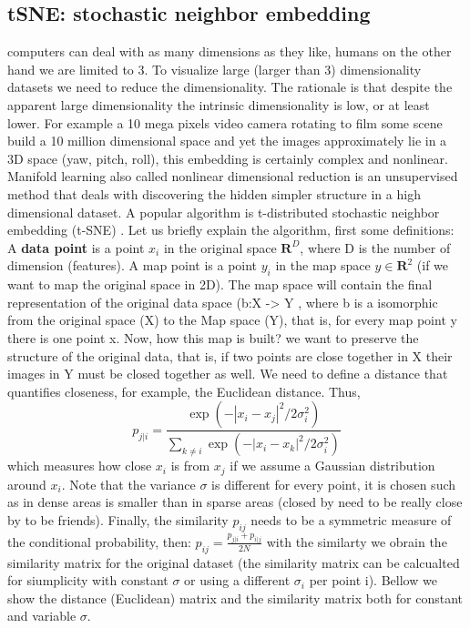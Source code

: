 \documentclass[11pt]{article}
\begin{document}
\subsection{tSNE: stochastic neighbor embedding}
computers can deal with as many dimensions as they like, humans on the other hand we are limited to 3. To visualize large (larger than 3) dimensionality datasets we need to reduce the dimensionality. The rationale is that despite the apparent large dimensionality the intrinsic dimensionality is low, or at least lower. For example a 10 mega pixels video camera rotating to film some scene build a 10 million dimensional space and yet the images approximately lie in a 3D space (yaw, pitch, roll), this embedding is certainly complex and nonlinear.
Manifold learning also called nonlinear dimensional reduction is an unsupervised method that deals with discovering the hidden simpler structure in a high dimensional dataset.
A popular algorithm is t-distributed stochastic neighbor embedding (t-SNE) \cite{maaten2008visualizing}.
Let us briefly explain the algorithm, first some definitions:
A \textbf{data point} is a point $x_i$ in the original space $\mathbf{R}^D$, where D is the number of dimension (features). A map point is a point $y_i$ in the map space $y \in \mathbf{R}^2$ (if we want to map the original space in 2D). The map space will contain the final representation of the original data space (b:X -> Y , where b is a isomorphic from the original space (X) to the Map space (Y), that is, for every map point y there is one point x. 
Now, how this map is built? we want to preserve the structure of the original data, that is, if two points are close together in X their images in Y must be closed together as well. We need to define a distance that quantifies closeness, for example, the Euclidean distance. Thus, 
\begin{equation}
p_{j|i} = \frac{\exp\left(-\left| x_i - x_j\right|^2 \big/ 2\sigma_i^2\right)}{\displaystyle\sum_{k \neq i} \exp\left(-\left| x_i - x_k\right|^2 \big/ 2\sigma_i^2\right)}
\end{equation}
which measures how close $x_i$ is from $x_j$ if we assume a Gaussian distribution around $x_i$. Note that the variance $\sigma$ is different for every point, it is chosen such as in dense areas is smaller than in sparse areas (closed by need to be really close by to be friends). 
Finally, the similarity $p_{ij}$ needs to be a symmetric measure of the conditional probability, then:
\(p_{ij} = \frac{p_{j|i} + p_{i|j}}{2N}\)
with the similarty we obrain the similarity matrix for the original dataset (the similarity matrix can be calcualted for siumplicity with constant $\sigma$ or using a different $\sigma_i$ per point i).
Bellow we show the distance (Euclidean) matrix and the similarity matrix both for constant and variable $\sigma$.
\end{document}
